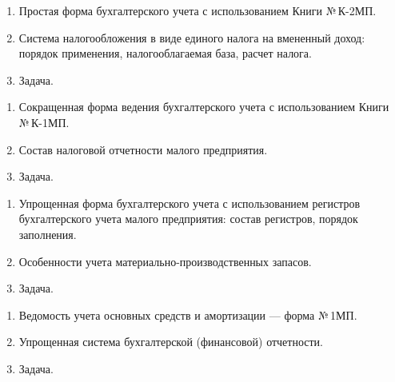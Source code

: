 \newpage


\shapkFull
\setcounter{zad}{0}

\begin{enumerate}
	\item Простая форма бухгалтерского учета с использованием Книги №\,К-2МП.

	\item Система налогообложения в виде единого налога на вмененный доход: порядок применения, налогооблагаемая база, расчет налога.

	\item Задача.
\end{enumerate}

\newpage


\shapkFull
\setcounter{zad}{0}

\begin{enumerate}
	\item Сокращенная форма ведения бухгалтерского учета с использованием Книги №\,К-1МП.

	\item Состав налоговой отчетности малого предприятия.

	\item Задача.
\end{enumerate}

\newpage


\shapkFull
\setcounter{zad}{0}

\begin{enumerate}
	\item Упрощенная форма бухгалтерского учета с использованием регистров бухгалтерского учета малого предприятия: состав регистров, порядок заполнения.

	\item Особенности учета материально-производственных запасов.

	\item Задача.
\end{enumerate}

\newpage


\shapkFull
\setcounter{zad}{0}

\begin{enumerate}
	\item Ведомость учета основных средств и амортизации --- форма №\,1МП.

	\item Упрощенная система бухгалтерской (финансовой) отчетности.

	\item Задача.
\end{enumerate}

